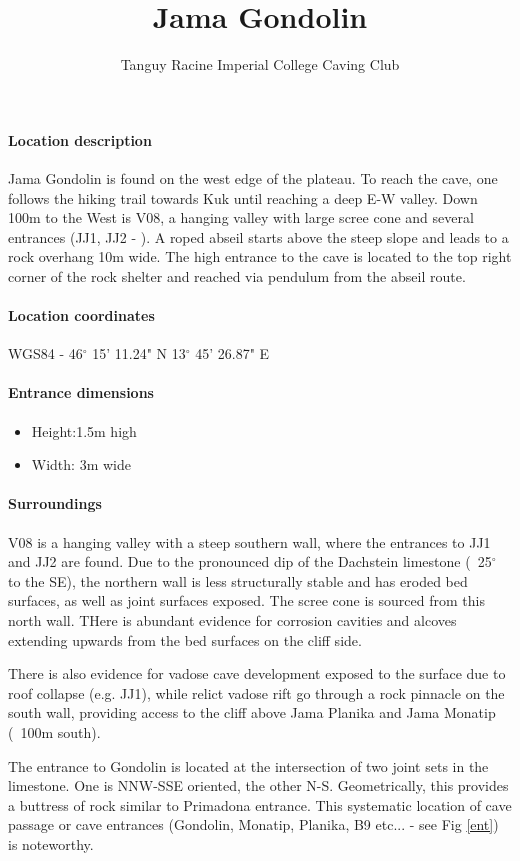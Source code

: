 \documentclass[symmetric, a4paper, 11pt]{article}
\title{Jama Gondolin}
\author{Tanguy Racine Imperial College Caving Club}
\begin{document}
\maketitle
\paragraph{Location description}
Jama Gondolin is found on the west edge of the plateau. To reach the cave, one follows the hiking trail towards Kuk until reaching a deep E-W valley. Down 100m to the West is V08, a hanging valley with large scree cone and several entrances (JJ1, JJ2 - \cite{hm1}). A roped abseil starts above the steep slope and leads to a rock overhang 10m wide. The high entrance to the cave is located to the top right corner of the rock shelter and reached via pendulum from the abseil route.

\paragraph{Location coordinates} WGS84 - 46$^{\circ}$ 15' 11.24" N 13$^{\circ}$ 45' 26.87" E
\paragraph{Entrance dimensions} 
\begin{itemize}
	\item Height:1.5m high 
	\item Width: 3m wide
\end{itemize}
\paragraph{Surroundings}
V08 is a hanging valley with a steep southern wall, where the entrances to JJ1 and JJ2 are found. Due to the pronounced dip of the Dachstein limestone (~25$^{\circ}$ to the SE), the northern wall is less structurally stable and has eroded bed surfaces, as well as joint surfaces exposed. The scree cone is sourced from this north wall. THere is abundant evidence for corrosion cavities and alcoves extending upwards from the bed surfaces on the cliff side. 

There is also evidence for vadose cave development exposed to the surface due to roof collapse (e.g. JJ1), while relict vadose rift go through a rock pinnacle on the south wall, providing access to the cliff above Jama Planika and Jama Monatip (~100m south).

The entrance to Gondolin is located at the intersection of two joint sets in the limestone. One is NNW-SSE oriented, the other N-S. Geometrically, this provides a buttress of rock similar to Primadona entrance. This systematic location of cave passage or cave entrances (Gondolin, Monatip, Planika, B9 etc... - see Fig \ref{ent}) is noteworthy. 
\end{document}
